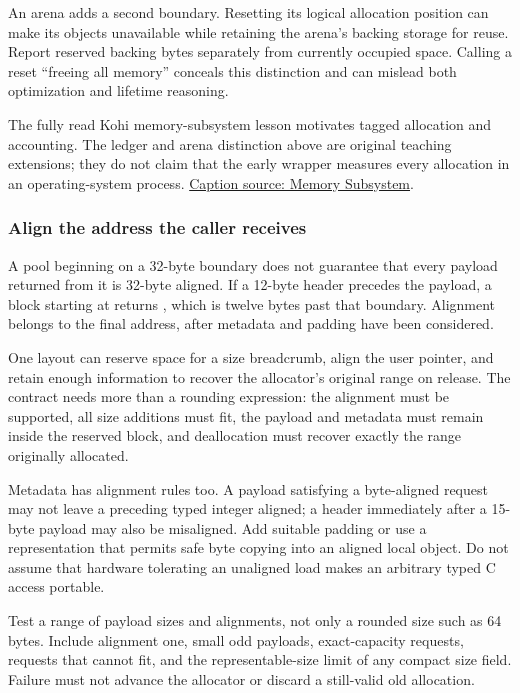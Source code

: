 An arena adds a second boundary. Resetting its logical allocation position can make its objects unavailable while retaining the arena's backing storage for reuse. Report reserved backing bytes separately from currently occupied space. Calling a reset ``freeing all memory'' conceals this distinction and can mislead both optimization and lifetime reasoning.

The fully read Kohi memory-subsystem lesson motivates tagged allocation and accounting. The ledger and arena distinction above are original teaching extensions; they do not claim that the early wrapper measures every allocation in an operating-system process. \href{https://www.youtube.com/watch?v=_GBUCo2FbUk}{Caption source: Memory Subsystem}.

\subsubsection{Align the address the caller receives}\label{05-engine-i-ch014-align-the-address-the-caller-receives}

\hypertarget{05-engine-i-ch014-align-the-address-the-caller-receives}{}

A pool beginning on a 32-byte boundary does not guarantee that every payload returned from it is 32-byte aligned. If a 12-byte header precedes the payload, a block starting at  returns , which is twelve bytes past that boundary. Alignment belongs to the final address, after metadata and padding have been considered.

One layout can reserve space for a size breadcrumb, align the user pointer, and retain enough information to recover the allocator's original range on release. The contract needs more than a rounding expression: the alignment must be supported, all size additions must fit, the payload and metadata must remain inside the reserved block, and deallocation must recover exactly the range originally allocated.

Metadata has alignment rules too. A payload satisfying a byte-aligned request may not leave a preceding typed integer aligned; a header immediately after a 15-byte payload may also be misaligned. Add suitable padding or use a representation that permits safe byte copying into an aligned local object. Do not assume that hardware tolerating an unaligned load makes an arbitrary typed C access portable.

Test a range of payload sizes and alignments, not only a rounded size such as 64 bytes. Include alignment one, small odd payloads, exact-capacity requests, requests that cannot fit, and the representable-size limit of any compact size field. Failure must not advance the allocator or discard a still-valid old allocation.

